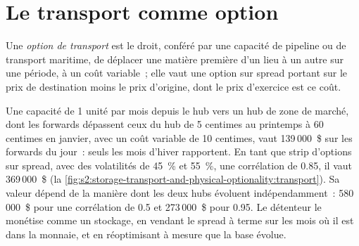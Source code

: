 \section{Le transport comme option}

\begin{definition}\label{def:s2:storage-transport-and-physical-optionality:transport}
Une \emph{option de transport} est le droit, conféré par une capacité de pipeline ou de transport maritime, de déplacer une matière première d'un lieu à
un autre sur une période, à un coût variable~; elle vaut une option sur spread portant sur le prix de destination moins le prix d'origine, dont le prix d'exercice est ce coût.
\end{definition}

Une capacité de 1 unité par mois depuis le hub vers un hub de zone de marché, dont les forwards dépassent ceux du hub de 5 centimes au printemps à 60 centimes en janvier, avec un
coût variable de 10 centimes, vaut 139\,000~\$ sur les forwards du jour~: seuls les mois d'hiver rapportent. En tant que strip d'options sur spread, avec des volatilités de 45~\%
et 55~\%, une corrélation de 0.85, il vaut 369\,000~\$ (la \cref{fig:s2:storage-transport-and-physical-optionality:transport}). Sa valeur dépend de la
manière dont les deux hubs évoluent indépendamment~: 580\,000~\$ pour une corrélation de 0.5 et 273\,000~\$ pour 0.95. Le détenteur le monétise comme un stockage, en vendant le
spread à terme sur les mois où il est dans la monnaie, et en réoptimisant à mesure que la base évolue.

\begin{omfigure}

\label{fig:s2:storage-transport-and-physical-optionality:transport}
\end{omfigure}

